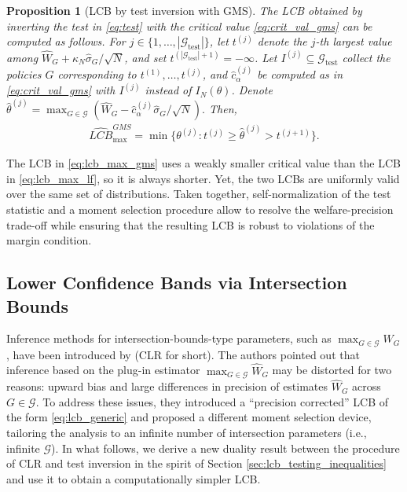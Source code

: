 \documentclass[12pt]{article}
\numberwithin{equation}{section}
\theoremstyle{plain}                         %
\newtheorem{proposition}{Proposition}
\theoremstyle{definition}                  %
\theoremstyle{remark}                      %
\begin{document}
\begin{proposition}[LCB by test inversion with GMS] \label{prop:max_gms} The LCB obtained by inverting the test in \eqref{eq:test} with the critical value \eqref{eq:crit_val_gms} can be computed as follows. For $j \in \{1, \dots, |\mathcal{G}_{\text{test}}|\}$, let $t^{(j)}$ denote the $j$-th largest value among $\widehat{W}_G + \kappa_N \widehat{\sigma}_G / \sqrt{N}$, and set $t^{(|\mathcal{G}_{\text{test}}| + 1)} = -\infty$. Let $I^{(j)} \subseteq \mathcal{G}_{\text{test}}$ collect the policies $G$ corresponding to $t^{(1)}, \dots, t^{(j)}$, and $\widehat{c}_{\alpha}^{(j)}$ be computed as in \eqref{eq:crit_val_gms} with $I^{(j)}$ instead of $I_N(\theta)$. Denote $ \hat{\theta}^{(j)} = \max_{G \in \mathcal{G}}(\widehat{W}_G - \widehat{c}^{(j)}_{\alpha} \widehat{\sigma}_G /\sqrt{N}).$ Then,
\begin{align}
\label{eq:lcb_max_gms}
\widehat{LCB}_{\max}^{GMS} = \min\{\theta^{(j)}: t^{(j)} \geqslant \hat{\theta}^{(j)} > t^{(j+1)}\}.
\end{align}
\end{proposition} 

The LCB in \eqref{eq:lcb_max_gms} uses a weakly smaller critical value than the LCB in \eqref{eq:lcb_max_lf}, so it is always shorter. Yet, the two LCBs are uniformly valid over the same set of distributions. Taken together, self-normalization of the test statistic and a moment selection procedure allow to resolve the welfare-precision trade-off while ensuring that the resulting LCB is robust to violations of the margin condition. 



\subsection{Lower Confidence Bands via Intersection Bounds}

Inference methods for intersection-bounds-type parameters, such as $\max_{G \in \mathcal{G}}W_G$, have been introduced by \citet{CLR} (CLR for short). The authors pointed out that inference based on the plug-in estimator $\max_{G \in \mathcal{G}}\widehat{W}_G$ may be distorted for two reasons: upward bias and large differences in precision of estimates $\widehat{W}_G$ across $G \in \mathcal{G}$. To address these issues, they introduced a ``precision corrected'' LCB of the form \eqref{eq:lcb_generic} and proposed a different moment selection device, tailoring the analysis to an infinite number of intersection parameters (i.e., infinite $\mathcal{G}$). In what follows, we derive a new duality result between the procedure of CLR and test inversion in the spirit of Section \ref{sec:lcb_testing_inequalities} and use it to obtain a computationally simpler LCB. 
\end{document}

